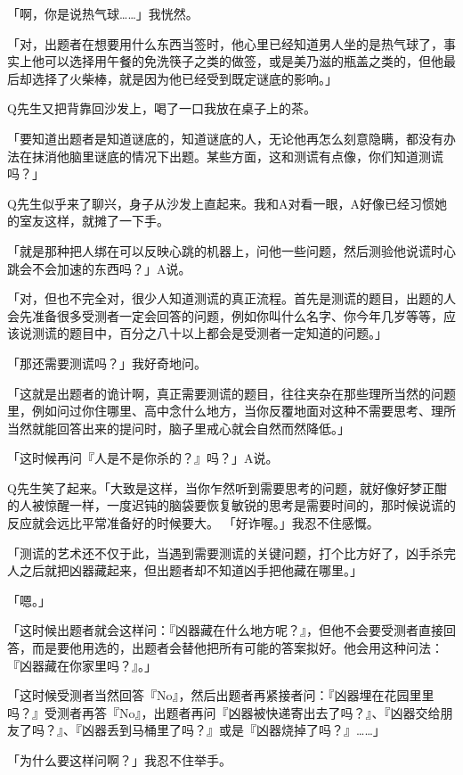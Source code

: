\documentclass{article}
\begin{document}
「啊，你是说热气球……」我恍然。 

「对，出题者在想要用什么东西当签时，他心里已经知道男人坐的是热气球了，事实上他可以选择用午餐的免洗筷子之类的做签，或是美乃滋的瓶盖之类的，但他最后却选择了火柴棒，就是因为他已经受到既定谜底的影响。」 

Q先生又把背靠回沙发上，喝了一口我放在桌子上的茶。 

「要知道出题者是知道谜底的，知道谜底的人，无论他再怎么刻意隐瞒，都没有办法在抹消他脑里谜底的情况下出题。某些方面，这和测谎有点像，你们知道测谎吗？」 

Q先生似乎来了聊兴，身子从沙发上直起来。我和A对看一眼，A好像已经习惯她的室友这样，就摊了一下手。 

「就是那种把人绑在可以反映心跳的机器上，问他一些问题，然后测验他说谎时心跳会不会加速的东西吗？」A说。 

\newpage

「对，但也不完全对，很少人知道测谎的真正流程。首先是测谎的题目，出题的人会先准备很多受测者一定会回答的问题，例如你叫什么名字、你今年几岁等等，应该说测谎的题目中，百分之八十以上都会是受测者一定知道的问题。」 

「那还需要测谎吗？」我好奇地问。 

「这就是出题者的诡计啊，真正需要测谎的题目，往往夹杂在那些理所当然的问题里，例如问过你住哪里、高中念什么地方，当你反覆地面对这种不需要思考、理所当然就能回答出来的提问时，脑子里戒心就会自然而然降低。」 

「这时候再问『人是不是你杀的？』吗？」A说。 

Q先生笑了起来。「大致是这样，当你乍然听到需要思考的问题，就好像好梦正酣的人被惊醒一样，一度迟钝的脑袋要恢复敏锐的思考是需要时间的，那时候说谎的反应就会远比平常准备好的时候要大。
「好诈喔。」我忍不住感慨。 

「测谎的艺术还不仅于此，当遇到需要测谎的关键问题，打个比方好了，凶手杀完人之后就把凶器藏起来，但出题者却不知道凶手把他藏在哪里。」 

\newpage

「嗯。」 

「这时候出题者就会这样问：『凶器藏在什么地方呢？』，但他不会要受测者直接回答，而是要他用选的，出题者会替他把所有可能的答案拟好。他会用这种问法：『凶器藏在你家里吗？』。」 

「这时候受测者当然回答『No』，然后出题者再紧接者问：『凶器埋在花园里里吗？』受测者再答『No』，出题者再问『凶器被快递寄出去了吗？』、『凶器交给朋友了吗？』、『凶器丢到马桶里了吗？』或是『凶器烧掉了吗？』……」 

「为什么要这样问啊？」我忍不住举手。 
\end{document}
